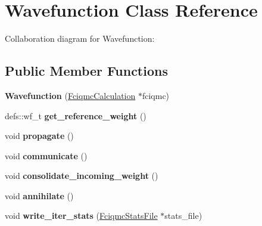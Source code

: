 \hypertarget{classWavefunction}{}\section{Wavefunction Class Reference}
\label{classWavefunction}


Collaboration diagram for Wavefunction\+:
\subsection*{Public Member Functions}
\begin{DoxyCompactItemize}
\item 
{\bfseries Wavefunction} (\hyperlink{classFciqmcCalculation}{Fciqmc\+Calculation} $\ast$fciqmc)\hypertarget{classWavefunction_a3366527332e758ccb9717a185d3861dc}{}\label{classWavefunction_a3366527332e758ccb9717a185d3861dc}

\item 
defs\+::wf\+\_\+t {\bfseries get\+\_\+reference\+\_\+weight} ()\hypertarget{classWavefunction_ab1e27036aa5e04ebc5c1fe8298dabe4d}{}\label{classWavefunction_ab1e27036aa5e04ebc5c1fe8298dabe4d}

\item 
void {\bfseries propagate} ()\hypertarget{classWavefunction_ab0b4bde2e3c3f58048b79508f06ed5aa}{}\label{classWavefunction_ab0b4bde2e3c3f58048b79508f06ed5aa}

\item 
void {\bfseries communicate} ()\hypertarget{classWavefunction_a5844af9aae578689f8e854e21e694b3b}{}\label{classWavefunction_a5844af9aae578689f8e854e21e694b3b}

\item 
void {\bfseries consolidate\+\_\+incoming\+\_\+weight} ()\hypertarget{classWavefunction_af63659ee2a28223bcc0848b550ffeecd}{}\label{classWavefunction_af63659ee2a28223bcc0848b550ffeecd}

\item 
void {\bfseries annihilate} ()\hypertarget{classWavefunction_ac295a3b53f122eeb04104c3561870820}{}\label{classWavefunction_ac295a3b53f122eeb04104c3561870820}

\item 
void {\bfseries write\+\_\+iter\+\_\+stats} (\hyperlink{structFciqmcStatsFile}{Fciqmc\+Stats\+File} $\ast$stats\+\_\+file)\hypertarget{classWavefunction_ade73eb2f93b8511afcfc7c2fc4fe93d0}{}\label{classWavefunction_ade73eb2f93b8511afcfc7c2fc4fe93d0}

\end{DoxyCompactItemize}

